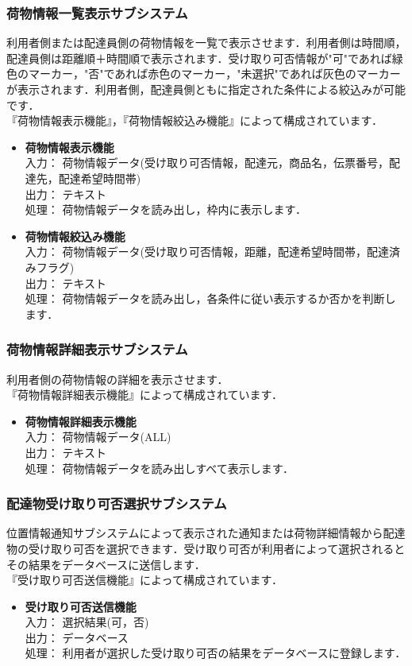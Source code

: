 \documentclass[a4j,titlepage]{jarticle}
\begin{document}
\subsubsection{荷物情報一覧表示サブシステム}
利用者側または配達員側の荷物情報を一覧で表示させます．利用者側は時間順，配達員側は距離順＋時間順で表示されます．受け取り可否情報が"可"であれば緑色のマーカー，"否"であれば赤色のマーカー，"未選択"であれば灰色のマーカーが表示されます．利用者側，配達員側ともに指定された条件による絞込みが可能です．\\
『荷物情報表示機能』，『荷物情報絞込み機能』によって構成されています．
\begin{itemize}
\item \textbf{荷物情報表示機能} \\
入力： 荷物情報データ(受け取り可否情報，配達元，商品名，伝票番号，配達先，配達希望時間帯) \\
出力： テキスト \\
処理： 荷物情報データを読み出し，枠内に表示します．
\item \textbf{荷物情報絞込み機能} \\
入力： 荷物情報データ(受け取り可否情報，距離，配達希望時間帯，配達済みフラグ) \\
出力： テキスト \\
処理： 荷物情報データを読み出し，各条件に従い表示するか否かを判断します．
\end{itemize}

\subsubsection{荷物情報詳細表示サブシステム}
利用者側の荷物情報の詳細を表示させます．\\
『荷物情報詳細表示機能』によって構成されています．
\begin{itemize}
\item \textbf{荷物情報詳細表示機能} \\
入力： 荷物情報データ(ALL) \\
出力： テキスト \\
処理： 荷物情報データを読み出しすべて表示します．
\end{itemize}

\subsubsection{配達物受け取り可否選択サブシステム}
位置情報通知サブシステムによって表示された通知または荷物詳細情報から配達物の受け取り可否を選択できます．受け取り可否が利用者によって選択されるとその結果をデータベースに送信します．\\
『受け取り可否送信機能』によって構成されています．
\begin{itemize}
\item \textbf{受け取り可否送信機能} \\
入力： 選択結果(可，否) \\
出力： データベース \\
処理： 利用者が選択した受け取り可否の結果をデータベースに登録します．
\end{itemize}
\end{document}
